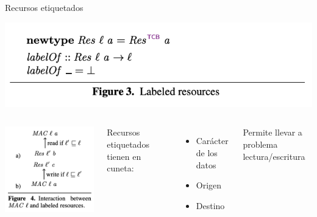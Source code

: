 \documentclass{beamer}
\begin{document}
\begin{frame}{Recursos etiquetados}
    
    \begin{center}
        \includegraphics[scale=0.7]{figure3.png}
    \end{center}
    \begin{columns}
            \begin{center}
                \includegraphics[scale=0.7]{figure4.png}
            \end{center}
        Recursos etiquetados tienen en cuneta:
        \begin{itemize}
            \item Carácter de los datos
            \item Origen
            \item Destino
        \end{itemize}
        \pause Permite llevar a problema lectura/escritura
    \end{columns}
\end{frame}
\end{document}
